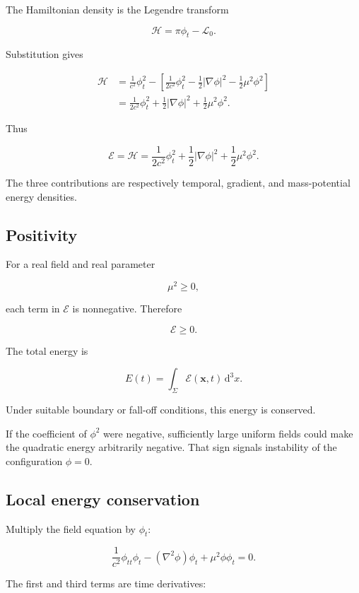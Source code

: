 The Hamiltonian density is the Legendre transform

\[
\mathcal{H}
=
\pi\phi_{t}-\mathcal{L}_{0}.
\]

Substitution gives

\[
\begin{aligned}
\mathcal{H}
&=
\frac{1}{c^{2}}\phi_{t}^{2}
-
\left[
\frac{1}{2c^{2}}\phi_{t}^{2}
-
\frac{1}{2}|\nabla\phi|^{2}
-
\frac{1}{2}\mu^{2}\phi^{2}
\right]\\
&=
\frac{1}{2c^{2}}\phi_{t}^{2}
+
\frac{1}{2}|\nabla\phi|^{2}
+
\frac{1}{2}\mu^{2}\phi^{2}.
\end{aligned}
\]

Thus

\[
\boxed{
\mathcal{E}
=
\mathcal{H}
=
\frac{1}{2c^{2}}\phi_{t}^{2}
+
\frac{1}{2}|\nabla\phi|^{2}
+
\frac{1}{2}\mu^{2}\phi^{2}
}.
\]

The three contributions are respectively temporal, gradient, and mass-potential energy densities.

\subsection{Positivity}

For a real field and real parameter

\[
\mu^{2}\geq0,
\]

each term in \(\mathcal{E}\) is nonnegative. Therefore

\[
\boxed{
\mathcal{E}\geq0
}.
\]

The total energy is

\[
\boxed{
E(t)
=
\int_{\Sigma}
\mathcal{E}(\mathbf{x},t)
\,\mathrm{d}^{3}x
}.
\]

Under suitable boundary or fall-off conditions, this energy is conserved.

If the coefficient of \(\phi^{2}\) were negative, sufficiently large uniform fields could make the quadratic energy arbitrarily negative. That sign signals instability of the configuration \(\phi=0\).

\subsection{Local energy conservation}

Multiply the field equation by \(\phi_{t}\):

\[
\frac{1}{c^{2}}\phi_{tt}\phi_{t}
-
(\nabla^{2}\phi)\phi_{t}
+
\mu^{2}\phi\phi_{t}
=0.
\]

The first and third terms are time derivatives:

